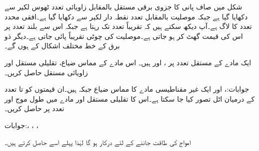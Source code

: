 شکل  میں صاف پانی کا جزوی برقی مستقل  بالمقابل زاویائی تعدد  ٹھوس لکیر سے دکھایا گیا ہے جبکہ موصلیت بالمقابل تعدد نقطہ دار لکیر سے دکھایا گیا ہے۔افقی محدد تعدد کا لاگ ہے۔آپ دیکھ سکتے ہیں کہ تقریباً  تعدد تک  رہتا ہے جبکہ اس سے بلند تعدد پر اس کی قیمت گھٹ کر  ہو جاتی ہے۔موصلیت کی چوٹی تقریباً  پائی جاتی ہے۔دیگر ذو برق کے خط مختلف اشکال کے ہوں گے۔

ایک مادے  کے مستقل  تعدد پر  ،  اور  ہیں۔ اس مادے کے مماس ضیاع، تقلیلی مستقل اور زاویائی مستقل حاصل کریں۔

جوابات:،  اور 
ایک غیر مقناطیسی مادے کا مماس ضیاع  جبکہ  ہیں۔ان قیمتوں کو  تا  تعدد کے درمیان اٹل تصور کیا جا سکتا ہے۔اس کا تقلیلی مستقل اور  مادے میں طول موج   اور  تعدد پر حاصل کریں۔

جوابات:، ، ،  

امواج کی طاقت جاننے کے لئے    درکار ہو گا لہٰذا پہلے اسے حاصل کرتے ہیں۔


